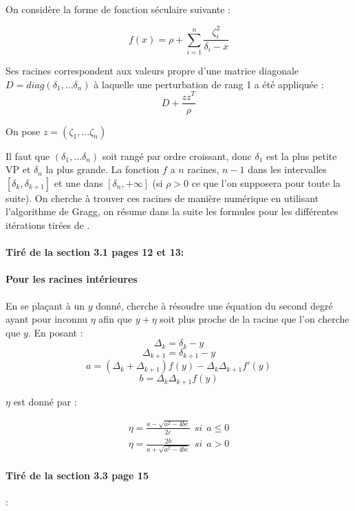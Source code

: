\documentclass[10pt,a4paper]{article}
\begin{document}
\paragraph{}

On considère la forme de fonction séculaire suivante :

$$f(x) = \rho + \sum_{i=1}^n \frac{\zeta_i^2}{\delta_i - x} $$

Ses racines correspondent aux valeurs propre d'une matrice diagonale $D = diag(\delta_1,...\delta_n) $ à laquelle une perturbation de rang 1 a été appliquée : 
$$ D + \frac{zz^T}{\rho}$$

On pose $z = (\zeta_1,...\zeta_n)$

Il faut que $(\delta_1,...\delta_n)$ soit rangé par ordre croissant, donc $\delta_1$ est la plus petite VP et $\delta_n$ la plus grande.
La fonction $f$ a $n$ racines, $n - 1$ dans les intervalles $[\delta_k, \delta_{k+1}]$ et une dans $[\delta_n, + \infty]$ (si $\rho >0$ ce que l'on supposera pour toute la suite). On cherche à trouver ces racines de manière numérique en utilisant l'algorithme de Gragg, on résume dans la suite les formules pour les différentes itérations tirées de \cite{1}.

\paragraph{Tiré de la section 3.1 pages 12 et 13:}

\paragraph{Pour les racines intérieures}
En se plaçant à un $y$ donné, cherche à résoudre une équation du second degré ayant pour inconnu $\eta$ afin que $y + \eta$ soit plus proche de la racine que l'on cherche que $y$. 
En posant : 
$$ \Delta_k = \delta_k - y$$ 
$$ \Delta_ {k+1} = \delta_{k+1} - y$$ 
$$ a = (\Delta_k + \Delta_{k+1}) f(y) - \Delta_k \Delta_{k+1}f'(y)$$
$$ b = \Delta_k \Delta_{k+1} f(y)$$

$\eta$ est donné par : 

\begin{eqnarray}\label{discri1}
\eta = \frac{a - \sqrt{a^2 - 4bc}}{2c}~~ si~~ a \leq 0 \\
\eta = \frac{2b}{a + \sqrt{a^2 - 4bc}}~~ si~~ a > 0
\end{eqnarray}

\paragraph{Tiré de la section 3.3 page 15}:
\end{document}

